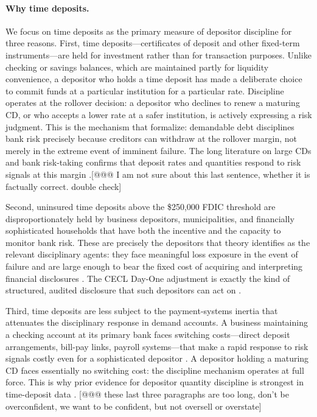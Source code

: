 \paragraph{Why time deposits.}
We focus on time deposits as the primary measure of depositor discipline for
three reasons.  First, time deposits---certificates of deposit and other
fixed-term instruments---are held for investment rather than for transaction
purposes.  Unlike checking or savings balances, which are maintained partly for
liquidity convenience, a depositor who holds a time deposit has made a deliberate
choice to commit funds at a particular institution for a particular rate.
Discipline operates at the rollover decision: a depositor who declines to renew a
maturing CD, or who accepts a lower rate at a safer institution, is actively
expressing a risk judgment.  This is the mechanism that \citet{calomiris1991role}
formalize: demandable debt disciplines bank risk precisely because creditors can
withdraw at the rollover margin, not merely in the extreme event of imminent
failure.  The long literature on large CDs and bank risk-taking confirms that
deposit rates and quantities respond to risk signals at this margin
\citep{hannan1988bank, ellis1992does, park1995market}.[@@@ I am not sure about this last sentence, whether it is factually correct. double check]

Second, uninsured time deposits above the \$250{,}000 FDIC threshold are
disproportionately held by business depositors, municipalities, and financially
sophisticated households that have both the incentive and the capacity to monitor
bank risk.  These are precisely the depositors that theory identifies as the
relevant disciplinary agents: they face meaningful loss exposure in the event of
failure and are large enough to bear the fixed cost of acquiring and interpreting
financial disclosures \citep{flannery1998using}.  The CECL Day-One adjustment is
exactly the kind of structured, audited disclosure that such depositors can act
on \citep{gee2022decision, kim2026current}.

Third, time deposits are less subject to the payment-systems inertia that
attenuates the disciplinary response in demand accounts.  A business maintaining a
checking account at its primary bank faces switching costs---direct deposit
arrangements, bill-pay links, payroll systems---that make a rapid response to risk
signals costly even for a sophisticated depositor \citep{iyer2016tale}.  A
depositor holding a maturing CD faces essentially no switching cost: the
discipline mechanism operates at full force.  This is why prior evidence for
depositor quantity discipline is strongest in time-deposit data
\citep{maechler2006dynamic, egan2017deposit}. [@@@ these last three paragraphs are too long, don't be overconfident, we want to be confident, but not oversell or overstate]

